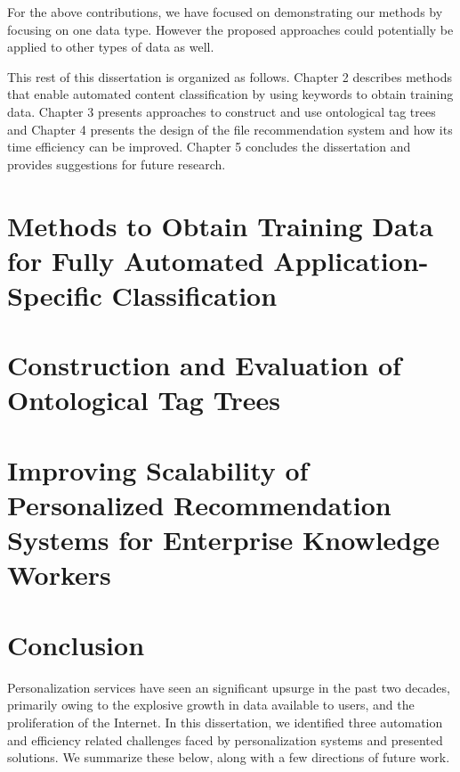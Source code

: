 \documentclass[12pt]{ucsddissertation}
\begin{document}
For the above contributions, we have focused on demonstrating our methods by focusing on one data type. However the proposed approaches could potentially be applied to other types of data as well.  

This rest of this dissertation is organized as follows. Chapter 2 describes methods that enable automated content classification by using keywords to obtain training data. Chapter 3 presents approaches to construct and use ontological tag trees and Chapter 4 presents the design of the file recommendation system and how its time efficiency can be improved. Chapter 5 concludes the dissertation and provides suggestions for future research. 



\chapter{Methods to Obtain Training Data for Fully Automated Application-Specific Classification}



\chapter{Construction and Evaluation of Ontological Tag Trees}



\chapter{Improving Scalability of Personalized Recommendation Systems for Enterprise Knowledge Workers}



\chapter{Conclusion}

Personalization services have seen an significant upsurge in the past two decades, primarily owing to the explosive growth in data available to users, and the proliferation of the Internet. In this dissertation, we identified three automation and efficiency related challenges faced by personalization systems and presented solutions. We summarize these below, along with a few directions of future work. 
\end{document}
